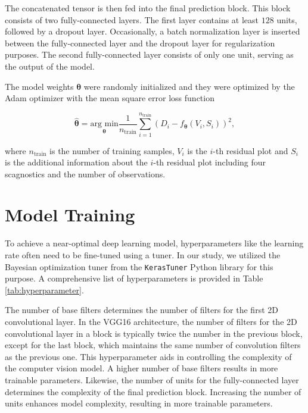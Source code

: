 \documentclass[]{interact}
\theoremstyle{plain}%
\theoremstyle{definition}
\theoremstyle{remark}
\begin{document}
The concatenated tensor is then fed into the final prediction block.
This block consists of two fully-connected layers. The first layer
contains at least \(128\) units, followed by a dropout layer.
Occasionally, a batch normalization layer is inserted between the
fully-connected layer and the dropout layer for regularization purposes.
The second fully-connected layer consists of only one unit, serving as
the output of the model.

The model weights \(\boldsymbol{\theta}\) were randomly initialized and
they were optimized by the Adam optimizer \citep{kingma2014adam} with
the mean square error loss function

\[\hat{\boldsymbol{\theta}} = \underset{\boldsymbol{\theta}}{\text{arg min}}\frac{1}{n_{\text{train}}}\sum_{i=1}^{n_{\text{train}}}(D_i - f_{\boldsymbol{\theta}}(V_i, S_i))^2,\]

\noindent where \(n_{\text{train}}\) is the number of training samples,
\(V_i\) is the \(i\)-th residual plot and \(S_i\) is the additional
information about the \(i\)-th residual plot including four scagnostics
and the number of observations.

\section{Model Training}\label{sec-model-training}

To achieve a near-optimal deep learning model, hyperparameters like the
learning rate often need to be fine-tuned using a tuner. In our study,
we utilized the Bayesian optimization tuner from the \texttt{KerasTuner}
Python library \citep{omalley2019kerastuner} for this purpose. A
comprehensive list of hyperparameters is provided in Table
\ref{tab:hyperparameter}.

The number of base filters determines the number of filters for the
first 2D convolutional layer. In the VGG16 architecture, the number of
filters for the 2D convolutional layer in a block is typically twice the
number in the previous block, except for the last block, which maintains
the same number of convolution filters as the previous one. This
hyperparameter aids in controlling the complexity of the computer vision
model. A higher number of base filters results in more trainable
parameters. Likewise, the number of units for the fully-connected layer
determines the complexity of the final prediction block. Increasing the
number of units enhances model complexity, resulting in more trainable
parameters.
\end{document}
